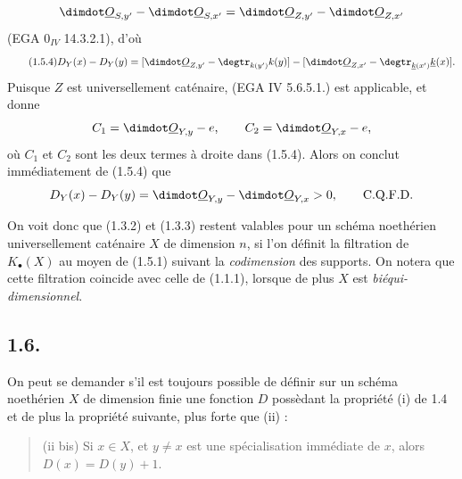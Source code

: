 
\[
\dimdot\underline{O}_{S,y'}-\dimdot\underline{O}_{S,x'}=\dimdot\underline{O}_{Z,y'}-\dimdot\underline{O}_{Z,x'}
\]
(EGA $0_{IV}$ 14.3.2.1), d'où
\begin{equation}\tag{1.5.4}
D_Y(x)-D_Y(y)=
[\dimdot\underline{O}_{Z,y'}-\degtr_{k(y')}k(y)]-[\dimdot\underline{O}_{Z,x'}-\degtr_{\underline{k}(x')}\underline{k}(x)].
\end{equation}
Puisque $Z$ est universellement caténaire, (EGA IV 5.6.5.1.) est applicable, et donne
\[
C_1=\dimdot\underline{O}_{Y,y}-e,\qquad C_2=\dimdot\underline{O}_{Y,x}-e,
\]
où $C_1$ et $C_2$ sont les deux termes à droite dans (1.5.4). Alors on conclut immédiatement de (1.5.4) que
\[
D_Y(x)-D_Y(y)=\dimdot\underline{O}_{Y,y}-\dimdot\underline{O}_{Y,x}>0,\qquad \text{C.Q.F.D.}
\]

On voit donc que (1.3.2) et (1.3.3) restent valables pour un schéma noethérien universellement caténaire $X$ de dimension $n$, si l'on définit la filtration de $K_\bullet(X)$ au moyen de (1.5.1) suivant la \emph{codimension} des supports. On notera que cette filtration coincide avec celle de (1.1.1), lorsque de plus $X$ est \emph{biéqui-dimensionnel}.

\subsection*{1.6.}
On peut se demander s'il est toujours possible de définir sur un schéma noethérien $X$ de dimension finie une fonction $D$ possèdant la propriété (i) de 1.4 et de plus la propriété suivante, plus forte que (ii) :
\begin{quote}
(ii bis) Si $x\in X$, et $y\ne x$ est une spécialisation immédiate de $x$, alors $D(x)=D(y)+1$.
\end{quote}
